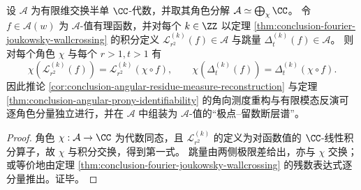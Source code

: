\begin{proposition}[与有限维交换半单通道的角色分解相容]\label{prop:conclusion-fourier-joukowsky-character-compatibility}
设 \(\mathcal A\) 为有限维交换半单 \(\CC\)-代数，并取其角色分解 \(\mathcal A\simeq\bigoplus_{\chi}\CC\)。
令 \(f\in \mathcal A(w)\) 为 \(\mathcal A\)-值有理函数，并对每个 \(k\in\ZZ\) 以定理 \ref{thm:conclusion-fourier-joukowsky-wallcrossing} 的积分定义 \(\mathcal L_{r^2}^{(k)}(f)\in\mathcal A\) 与跳量 \(\Delta_t^{(k)}(f)\in\mathcal A\)。
则对每个角色 \(\chi\) 与每个 \(r>1,t>1\) 有
\[
\chi\!\left(\mathcal L_{r^2}^{(k)}(f)\right)=\mathcal L_{r^2}^{(k)}(\chi\circ f),
\qquad
\chi\!\left(\Delta_t^{(k)}(f)\right)=\Delta_t^{(k)}(\chi\circ f).
\]
因此推论 \ref{cor:conclusion-angular-residue-measure-reconstruction} 与定理 \ref{thm:conclusion-angular-prony-identifiability} 的角向测度重构与有限模态反演可逐角色分量独立进行，并在 \(\mathcal A\) 中组装为 \(\mathcal A\)-值的“极点--留数断层谱”。
\end{proposition}
\begin{proof}
角色 \(\chi:\mathcal A\to\CC\) 为代数同态，且 \(\mathcal L_{r^2}^{(k)}\) 的定义为对函数值的 \(\CC\)-线性积分算子，故 \(\chi\) 与积分交换，得到第一式。
跳量由两侧极限差给出，亦与 \(\chi\) 交换；或等价地由定理 \ref{thm:conclusion-fourier-joukowsky-wallcrossing} 的残数表达式逐分量推出。证毕。
\end{proof}

